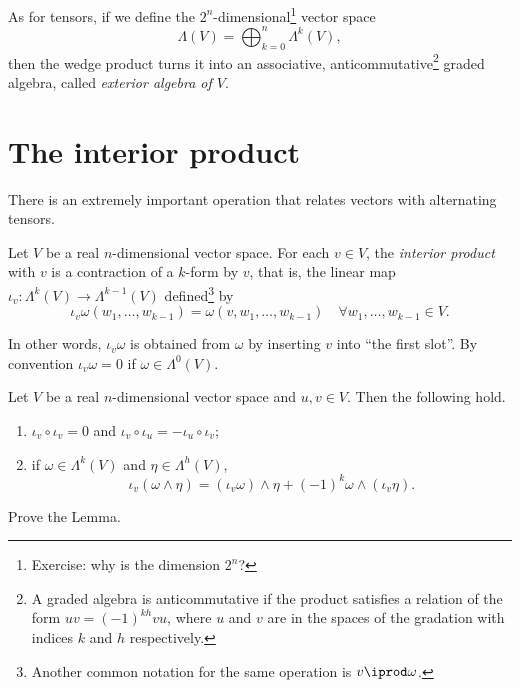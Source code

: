\begin{remark}
	As for tensors, if we define the $2^n$-dimensional\footnote{Exercise: why is the dimension $2^n$?} vector space
	\begin{equation}
		\Lambda(V) = \bigoplus_{k=0}^n \Lambda^k(V),
	\end{equation}
	then the wedge product turns it into an associative, anticommutative\footnote{A graded algebra is anticommutative if the product satisfies a relation of the form $uv = {(-1)}^{kh}vu$, where $u$ and $v$ are in the spaces of the gradation with indices $k$ and $h$ respectively.} graded algebra, called \emph{exterior algebra of $V$}.
\end{remark}

\section{The interior product}

There is an extremely important operation that relates vectors with alternating tensors.

\begin{definition}
	Let $V$ be a real $n$-dimensional vector space.
	For each $v\in V$, the \emph{interior product} with $v$ is a contraction of a $k$-form by $v$, that is, the linear map $\iota_v:\Lambda^{k}(V)\to \Lambda^{k-1}(V)$ defined\footnote{Another common notation for the same operation is $v \iprod \omega$.} by
	\begin{equation}
		\iota_v\omega(w_1,\ldots,w_{k-1}) = \omega(v,w_1,\ldots,w_{k-1})
		\quad \forall w_1,\ldots,w_{k-1} \in V.
	\end{equation}
\end{definition}

In other words, $\iota_v\omega$ is obtained from $\omega$ by inserting $v$ into ``the first slot''.
By convention $\iota_v\omega = 0$ if $\omega\in\Lambda^0(V)$.

\begin{lemma}\label{lemma:intprod}
	Let $V$ be a real $n$-dimensional vector space and $u,v\in V$.
	Then the following hold.
	\begin{enumerate}
		\item $\iota_v\circ \iota_v = 0$ and $\iota_v\circ\iota_u = -\iota_u\circ\iota_v$;
		\item if $\omega\in\Lambda^k(V)$ and $\eta\in\Lambda^h(V)$,
		      \begin{equation}
			      \iota_v(\omega\wedge\eta) = (\iota_v\omega)\wedge\eta + {(-1)}^k\omega\wedge(\iota_v\eta).
		      \end{equation}
	\end{enumerate}
\end{lemma}
\begin{exercise}
	Prove the Lemma.
\end{exercise}

